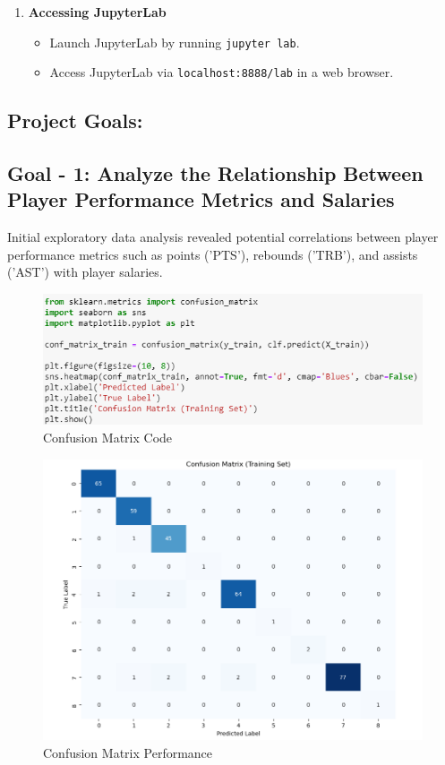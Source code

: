 \documentclass{article}
\begin{document}
\begin{enumerate}
    \item \textbf{Accessing JupyterLab}
\begin{itemize}
    \item Launch JupyterLab by running \texttt{jupyter lab}.
    \item Access JupyterLab via \texttt{localhost:8888/lab} in a web browser.
\end{itemize}

\end{enumerate}


\subsection*{Project Goals:}

\subsection*{Goal - 1: Analyze the Relationship Between Player Performance Metrics and Salaries}
Initial exploratory data analysis revealed potential correlations between player performance metrics such as points ('PTS'), rebounds ('TRB'), and assists ('AST') with player salaries.

\FloatBarrier
\begin{figure}[h]
    \centering
    \includegraphics[width=0.5\linewidth]{ConfusionMatrixCode.png}
    \caption{Confusion Matrix Code}
    \label{fig:confusion_matrix_code}
\end{figure}

\FloatBarrier
\begin{figure}[h]
    \centering
    \includegraphics[width=1\linewidth]{ConfusionMatrix.png}
    \caption{Confusion Matrix Performance}
    \label{fig:confusion_matrix}
\end{figure}
\end{document}
